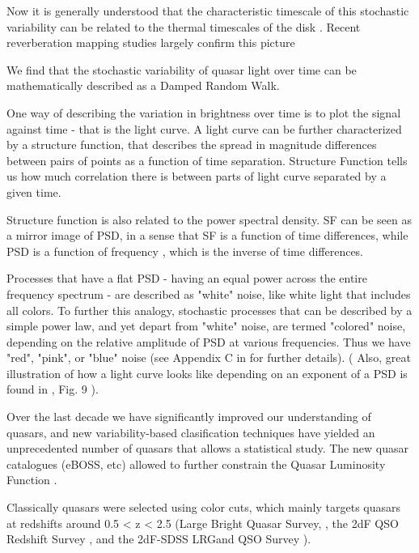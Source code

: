 \documentclass[modern]{aastex62}
\begin{document}
Now it is generally understood that the characteristic timescale of this stochastic  variability can be related to the thermal timescales of the disk \citep{kelly2007, zu2013, kozlowski2016a}. Recent reverberation mapping studies largely confirm this picture \citep{sun2015}




We find that the stochastic variability of quasar light over time can be mathematically described as a Damped Random Walk. 



One way of describing the variation in brightness over time is to plot the signal against time - that is the light curve.  A light curve can be further characterized by a structure function, that describes the spread in magnitude differences between pairs of points as a function of time separation. Structure Function tells us how much correlation there is between parts of light curve separated by a given time.  

Structure function is also related to the power spectral density. SF can be seen as a mirror image of PSD, in a sense that SF is a function of time differences, while PSD is a function of frequency , which is the inverse of  time differences. 

Processes that have a flat PSD - having an equal power across the entire frequency spectrum -  are described as "white" noise, like white light that includes all colors. To further this analogy, stochastic processes that can be described by a simple power law, and yet depart from "white" noise, are termed  "colored" noise, depending on the relative amplitude of PSD at various frequencies. Thus we have "red", "pink", or "blue" noise   (see Appendix  C in \cite{kasliwal2017} for further details). ( Also, great illustration of how a light curve looks like depending on an exponent of a PSD is found in \cite{macleod2010}, Fig. 9 ). 



Over the last decade we have significantly improved our understanding of quasars, and new variability-based clasification techniques \citep{fan2001, richards2006, kozlowski2010, palanque2011, macleod2011, graham2014, alsayyad2016, ruan2017} have yielded an unprecedented number of quasars that allows a statistical study. The new quasar catalogues (eBOSS, etc) allowed  to further constrain the Quasar Luminosity Function \citep{ross2013, myers2015, palanque2016}.

Classically quasars were selected using color cuts,  which mainly targets quasars at redshifts around 0.5 < z < 2.5 (Large Bright Quasar Survey, \cite{hewett1995}, the 2dF QSO Redshift Survey \cite{croom2004}, and the 2dF-SDSS LRGand QSO Survey \cite{croom2009}). 
\end{document}
